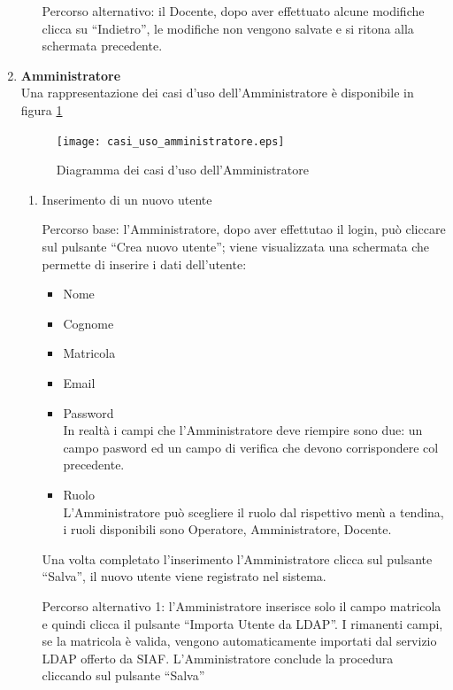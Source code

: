 \begin{enumerate}
\begin{enumerate}
 Percorso alternativo:
 il Docente, dopo aver effettuato alcune modifiche clicca su ``Indietro'', le modifiche non vengono salvate e si ritona alla schermata precedente.

 
\end{enumerate}



\item \textbf{Amministratore}\\
Una rappresentazione dei casi d'uso dell'Amministratore è disponibile in figura \ref{use_case_diag_admin}
\begin{figure}[h]
  \caption{Diagramma dei casi d'uso dell'Amministratore}
  \label{use_case_diag_admin}
  \centering
    \texttt{[image: casi\_uso\_amministratore.eps]}
\end{figure}


\begin{enumerate}
 \item Inserimento di un nuovo utente\\ \label{UC_new_user}
 
 
 Percorso base:
 l'Amministratore, dopo aver effettutao il login, può cliccare sul pulsante ``Crea nuovo utente''; viene visualizzata una schermata che permette
 di inserire i dati dell'utente:
 \begin{itemize}
  \item Nome
  \item Cognome
  \item Matricola
  \item Email
  \item	Password\\
    In realtà i campi che l'Amministratore deve riempire sono due: un campo pasword ed un campo di verifica che devono corrispondere col precedente.
  \item Ruolo\\
    L'Amministratore può scegliere il ruolo dal rispettivo menù a tendina, i ruoli disponibili sono Operatore, Amministratore, Docente.
 \end{itemize}
 
 Una volta completato l'inserimento l'Amministratore clicca sul pulsante ``Salva'', il nuovo utente viene registrato nel sistema. 

 Percorso alternativo 1:
 l'Amministratore inserisce solo il campo matricola e quindi clicca il pulsante ``Importa Utente da LDAP''. I rimanenti campi, se la matricola è valida,
 vengono automaticamente importati dal servizio LDAP offerto da SIAF. L'Amministratore conclude la procedura cliccando sul pulsante ``Salva''
 

\end{enumerate}
\end{enumerate}
